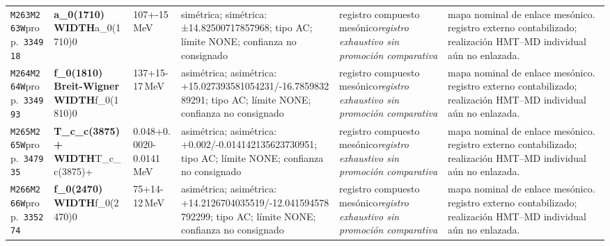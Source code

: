 \begin{landscape}
\begin{longtable}{L{1.85cm}L{4.45cm}L{2.35cm}L{4.05cm}L{3.35cm}L{7.15cm}}
\texttt{M263}\newline \texttt{M263W}\newline prop.\ \texttt{334918} & \textbf{a\_\allowbreak{}0(1710) WIDTH}\newline a\_\allowbreak{}0(1710)0 & 107+-15\,MeV & simétrica; simétrica: ±14.82500717857968; tipo AC; límite NONE; confianza no consignado & registro compuesto mesónico\newline \emph{registro exhaustivo sin promoción comparativa} & mapa nominal de enlace mesónico. registro externo contabilizado; realización HMT--MD individual aún no enlazada. \\
\texttt{M264}\newline \texttt{M264W}\newline prop.\ \texttt{334993} & \textbf{f\_\allowbreak{}0(1810) Breit-Wigner WIDTH}\newline f\_\allowbreak{}0(1810)0 & 137+15-17\,MeV & asimétrica; asimétrica: +15.027393581054231/-16.785983289291; tipo AC; límite NONE; confianza no consignado & registro compuesto mesónico\newline \emph{registro exhaustivo sin promoción comparativa} & mapa nominal de enlace mesónico. registro externo contabilizado; realización HMT--MD individual aún no enlazada. \\
\texttt{M265}\newline \texttt{M265W}\newline prop.\ \texttt{347935} & \textbf{T\_\allowbreak{}c\_\allowbreak{}c(3875)+ WIDTH}\newline T\_\allowbreak{}c\_\allowbreak{}c(3875)+ & 0.048+0.0020-0.0141\,MeV & asimétrica; asimétrica: +0.002/-0.014142135623730951; tipo AC; límite NONE; confianza no consignado & registro compuesto mesónico\newline \emph{registro exhaustivo sin promoción comparativa} & mapa nominal de enlace mesónico. registro externo contabilizado; realización HMT--MD individual aún no enlazada. \\
\texttt{M266}\newline \texttt{M266W}\newline prop.\ \texttt{335274} & \textbf{f\_\allowbreak{}0(2470) WIDTH}\newline f\_\allowbreak{}0(2470)0 & 75+14-12\,MeV & asimétrica; asimétrica: +14.2126704035519/-12.041594578792299; tipo AC; límite NONE; confianza no consignado & registro compuesto mesónico\newline \emph{registro exhaustivo sin promoción comparativa} & mapa nominal de enlace mesónico. registro externo contabilizado; realización HMT--MD individual aún no enlazada. \\

\end{longtable}
\end{landscape}
